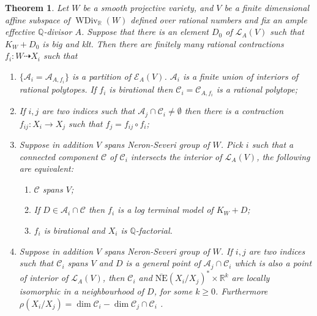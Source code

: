 \documentclass{article}
\newtheorem{thm}[defn]{Theorem}
\begin{document}
\begin{thm}\label{mapbetweenAM}
  \cite[Theorem 3.3]{haconSarkisovProgram2011} Let $W$ be a smooth projective   variety, and  $ V $ be a finite dimensional affine subspace of $ \operatorname{WDiv}_{\mathbb{R}}(W) $ defined over rational numbers and fix an ample effective $\mathbb{Q}$-divisor $A$. Suppose that there is an element $D_{0}$ of $\mathcal{L}_{A}(V)$ such that $K_{W}+D_{0}$ is big and klt. Then there are finitely many rational contractions $ f_i:W\dashrightarrow X_i $ such that
  \begin{enumerate}
    \item $ \{\mathcal{A}_i=\mathcal{A}_{A,f_i}\} $ is a partition of $ \mathcal{E}_{A}(V) $. $ \mathcal{A}_i $ is a finite union of interiors of rational polytopes. If $ f_i $ is birational then $ \mathcal{C}_i=\mathcal{C}_{A,f_i} $ is a rational polytope;
    \item If $ i,j $ are two indices such that $ \mathcal{A}_j\cap \mathcal{C}_i\neq \emptyset $ then there is a contraction $ f_{ij}:X_i\to X_j $ such that $ f_j=f_{ij}\circ f_i $;
    \item Suppose in addition $ V $ spans Neron-Severi group of $W$. Pick $ i $ such that a connected component $ \mathcal{C} $ of $ \mathcal{C}_i $ intersects the interior of $ \mathcal{L}_A(V) $, the following are equivalent:
    \begin{enumerate} 
      \item $ \mathcal{C} $ spans $ V $;
      \item If $ D\in \mathcal{A}_i\cap \mathcal{C} $ then $ f_i $ is a log terminal model of $ K_W+D $;
      \item $ f_i $ is birational and $ X_i $ is $ \mathbb{Q} $-factorial.
    \end{enumerate}
    \item Suppose in addition $ V $ spans Neron-Severi group of $W$. If $ i,j $ are two indices such that $ \mathcal{C}_i $ spans $ V $ and $ D $ is a general point of $ \mathcal{A}_j\cap \mathcal{C}_i $ which is also a point of interior of $ \mathcal{L}_A(V) $, then $ \mathcal{C}_i $ and $ \overline{\mathrm{NE}}(X_i/X_j)^*\times \mathbb{R}^k $ are locally isomorphic in a neighbourhood of $D$,  for some $ k\geqslant 0 $. Furthermore $ \rho(X_i/X_j)=\dim  \mathcal{C}_i-\dim \mathcal{C}_j\cap \mathcal{C}_i   $ .
  \end{enumerate}
\end{thm}
\end{document}
